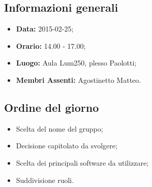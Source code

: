 \subsection{Informazioni generali}
\begin{itemize}
	\item \textbf{Data:} 2015-02-25;
	\item \textbf{Orario:} 14.00 - 17.00;
	\item \textbf{Luogo:} Aula Lum250, plesso Paolotti;
	\item \textbf{Membri Assenti:} Agostinetto Matteo.
\end{itemize}

\subsection{Ordine del giorno}
\begin{itemize}
	\item Scelta del nome del gruppo;
	\item Decisione capitolato da svolgere;
	\item Scelta dei principali software da utilizzare;
	\item Suddivisione ruoli.
\end{itemize}








